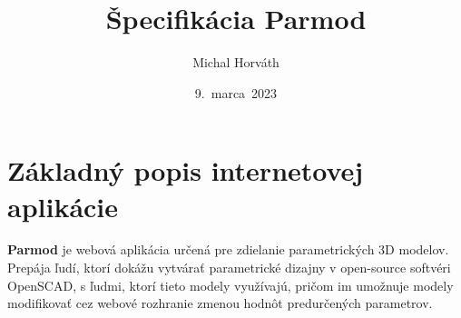 \documentclass[a4paper]{article}
\title{Špecifikácia Parmod}
\author{Michal Horváth }
\date{9.\ marca\ 2023}
\begin{document}
\maketitle

\section{Základný popis internetovej aplikácie}
\textbf{Parmod} je webová aplikácia určená pre zdielanie parametrických 3D modelov.
Prepája ľudí, ktorí dokážu vytvárať parametrické dizajny 
v open-source softvéri OpenSCAD,
s ľudmi, ktorí tieto modely využívajú,
pričom im umožnuje modely modifikovať
cez webové rozhranie zmenou hodnôt predurčených parametrov.

\
\end{document}
